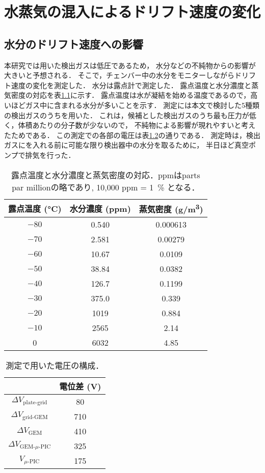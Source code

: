 \documentclass[../master]{subfiles}
\begin{document}
\chapter{水蒸気の混入によるドリフト速度の変化}
\label{app::drift_speed_humid_dep}
\section{水分のドリフト速度への影響}
本研究では用いた検出ガスは低圧であるため，
水分などの不純物からの影響が大きいと予想される．
そこで，チェンバー中の水分をモニターしながらドリフト速度の変化を測定した．
水分は露点計で測定した．
露点温度と水分濃度と蒸気密度の対応を表\ref{tab::dew_point_humidity}に示す．
露点温度は水が凝結を始める温度であるので，高いほどガス中に含まれる水分が多いことを示す．
測定には本文で検討した5種類の検出ガスのうち\Methane を用いた．
これは，候補とした検出ガスのうち最も圧力が低く，体積あたりの分子数が少ないので，
不純物による影響が現れやすいと考えたためである．
この測定での各部の電圧は表\ref{tab::configuration_for_drift_dep}の通りである．
測定時は，検出ガスにを入れる前に可能な限り検出器中の水分を取るために，
半日ほど真空ポンプで排気を行った．
\begin{table}
  \centering
  \caption{露点温度と水分濃度と蒸気密度の対応．ppmはparts par millionの略であり, 10,000 ppm = \SI{1}{\percent} となる．}
  \label{tab::dew_point_humidity}
  \begin{tabular}{ccc}
    \toprule
    露点温度 (\si{\degreeCelsius}) & 水分濃度 (ppm) & 蒸気密度 (\si{\gram/\cubic\metre}) \\
    \midrule
    $-80$ & 0.540 & 0.000613 \\
    $-70$ & 2.581 & 0.00279 \\
    $-60$ & 10.67 & 0.0109 \\
    $-50$ & 38.84 & 0.0382 \\
    $-40$ & 126.7 & 0.1199 \\
    $-30$ & 375.0 & 0.339 \\
    $-20$ & 1019 & 0.884 \\
    $-10$ & 2565 & 2.14 \\
    0     & 6032 & 4.85 \\
    \bottomrule
  \end{tabular}
\end{table}
\begin{table}
  \centering
  \caption{測定で用いた電圧の構成．}
  \label{tab::configuration_for_drift_dep}
  \begin{tabular}{cc}
    \toprule
    & 電位差 (\si{\volt}) \\
    \midrule
    $\Delta V_{\text{plate-grid}}$ & 80 \\
    $\Delta V_{\text{grid-GEM}}$ & 710 \\
    $\Delta V_{\text{GEM}}$ & 410 \\
    $\Delta V_{\text{GEM-}\mu\text{-PIC}}$ & 325 \\
    $V_{\mu\text{-PIC}}$ & 175 \\
    \bottomrule
  \end{tabular}
\end{table}
\end{document}
